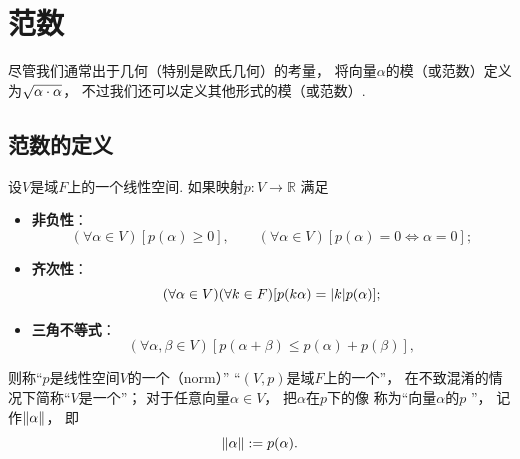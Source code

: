 \section{范数}
尽管我们通常出于几何（特别是欧氏几何）的考量，
将向量\(\alpha\)的模（或范数）定义为\(\sqrt{\alpha\cdot\alpha}\)，
不过我们还可以定义其他形式的模（或范数）.

\subsection{范数的定义}
\begin{definition}
设\(V\)是域\(F\)上的一个线性空间.
如果映射\(p\colon V \to \mathbb{R}\)
满足\begin{itemize}
	\item {\rm\bf 非负性}：\begin{equation*}
		(\forall \alpha \in V)
		[p(\alpha) \geq 0],
		\qquad
		(\forall \alpha \in V)
		[
			p(\alpha) = 0
			\iff
			\alpha = 0
		];
	\end{equation*}

	\item {\rm\bf 齐次性}：\begin{equation*}
		(\forall \alpha \in V)
		(\forall k \in F)
		[
			p(k \alpha) = \abs{k} p(\alpha)
		];
	\end{equation*}

	\item {\rm\bf 三角不等式}：\begin{equation*}
		(\forall \alpha,\beta \in V)
		[
			p(\alpha+\beta) \leq p(\alpha) + p(\beta)
		],
	\end{equation*}
\end{itemize}
则称“\(p\)是线性空间\(V\)的一个（norm）”
“\((V,p)\)是域\(F\)上的一个”，
在不致混淆的情况下简称“\(V\)是一个”；
对于任意向量\(\alpha \in V\)，
把\(\alpha\)在\(p\)下的像
称为“向量\(\alpha\)的\(p\) ”，
记作\(\norm{\alpha}\)，
即\begin{equation*}
	\norm{\alpha}
	:=
	p(\alpha).
\end{equation*}
\end{definition}

